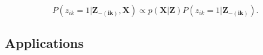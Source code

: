 \begin{equation}
  P(z_{ik}=1|\bm{Z_{-(ik)},X})  \propto p(\bm{X|Z}) P(z_{ik}=1|\bm{Z_{-(ik)}}).
\end{equation}






\subsection{Applications}


